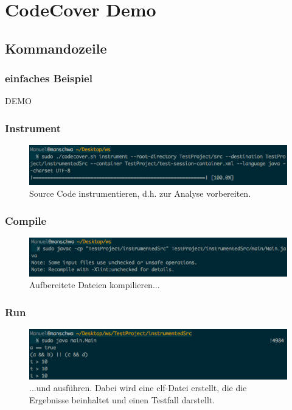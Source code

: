 \documentclass{beamer}
\begin{document}
  \section{CodeCover Demo}
  \subsection{Kommandozeile}
  \begin{frame}\frametitle{einfaches Beispiel}
    \centering \Huge{DEMO}\\
  \end{frame}

	\begin{frame}\frametitle{Instrument}
    \begin{figure}%
			\includegraphics[width=\columnwidth]{pictures/demo_commandline/01_instrument.png}%
			\caption{Source Code instrumentieren, d.h. zur Analyse vorbereiten.}%
			\label{}%
		\end{figure}
  \end{frame}
  
  \begin{frame}\frametitle{Compile}
    \begin{figure}%
			\includegraphics[width=\columnwidth]{pictures/demo_commandline/02_compile.png}%
			\caption{Aufbereitete Dateien kompilieren...}%
			\label{}%
		\end{figure}
  \end{frame}
  
  \begin{frame}\frametitle{Run}
    \begin{figure}%
			\includegraphics[width=\columnwidth]{pictures/demo_commandline/03_run.png}%
			\caption{...und ausführen. Dabei wird eine clf-Datei erstellt, die die Ergebnisse beinhaltet und einen Testfall darstellt.}%
			\label{}%
		\end{figure}
  \end{frame}
  
\end{document}
